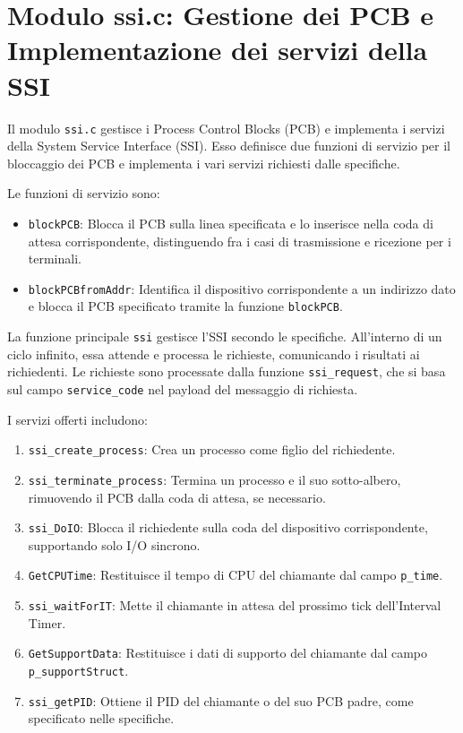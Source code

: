 \documentclass[a4paper]{article}
\begin{document}
\section{Modulo ssi.c: Gestione dei PCB e Implementazione dei servizi della SSI}

Il modulo \texttt{ssi.c} gestisce i Process Control Blocks (PCB) e implementa i servizi della System Service Interface (SSI). Esso definisce due funzioni di servizio per il bloccaggio dei PCB e implementa i vari servizi richiesti dalle specifiche.

Le funzioni di servizio sono:

\begin{itemize}
\item \texttt{blockPCB}: Blocca il PCB sulla linea specificata e lo inserisce nella coda di attesa corrispondente, distinguendo fra i casi di trasmissione e ricezione per i terminali.

\item \texttt{blockPCBfromAddr}: Identifica il dispositivo corrispondente a un indirizzo dato e blocca il PCB specificato tramite la funzione \texttt{blockPCB}.

\end{itemize}

La funzione principale \texttt{ssi} gestisce l'SSI secondo le specifiche. All'interno di un ciclo infinito, essa attende e processa le richieste, comunicando i risultati ai richiedenti. Le richieste sono processate dalla funzione \verb+ssi_request+, che si basa sul campo \verb+service_code+ nel payload del messaggio di richiesta.

I servizi offerti includono:

\begin{enumerate}
\item \verb+ssi_create_process+: Crea un processo come figlio del richiedente.


\item \texttt{ssi\_terminate\_process}: Termina un processo e il suo sotto-albero, rimuovendo il PCB dalla coda di attesa, se necessario.

\item \texttt{ssi\_DoIO}: Blocca il richiedente sulla coda del dispositivo corrispondente, supportando solo I/O sincrono.

\item \texttt{GetCPUTime}: Restituisce il tempo di CPU del chiamante dal campo \texttt{p\_time}.

\item \texttt{ssi\_waitForIT}: Mette il chiamante in attesa del prossimo tick dell'Interval Timer.

\item \texttt{GetSupportData}: Restituisce i dati di supporto del chiamante dal campo \texttt{p\_supportStruct}.

\item \texttt{ssi\_getPID}: Ottiene il PID del chiamante o del suo PCB padre, come specificato nelle specifiche.

\end{enumerate}
\end{document}
